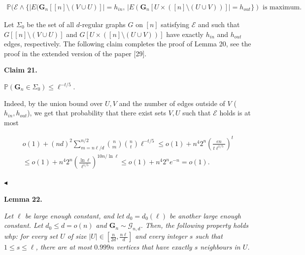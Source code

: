 \[\begin{gathered}
\mathbb{P}(\mathcal{E}\wedge\{|E(\mathbf{G}_{n}[[n]\setminus(V\cup U)]|=h_{in},\,|E(\mathbf{G}_{n}[U\times([n]\setminus(U\cup V))]|=h_{out}\})\text{ is maximum}.
\end{gathered}\]


Let $\Sigma_{0}$ be the set of all $d$-regular graphs $G$ on $[n]$ satisfying $\mathcal{E}$ and such that $G[[n]\setminus(V\cup U)]$ and $G[U\times([n]\setminus(U\cup V))]$ have exactly $h_{in}$ and $h_{out}$ edges, respectively. The following claim completes the proof of Lemma 20, see the proof in the extended version of the paper [29].\par





\par\medskip\noindent\textbf{
Claim 21. 
}\par



$\mathbb{P}(\mathbf{G}_{n}\in\Sigma_{0})\leq\ell^{-t/5}$.\par






Indeed, by the union bound over $U,V$ and the number of edges outside of $V$ ($h_{in},h_{out}$), we get that probability that there exist sets $V,U$ such that $\mathcal{E}$ holds is at most\par


\[\begin{gathered}
\displaystyle o(1)+(nd)^{2} \displaystyle\sum_{m=n\ell/d}^{n/2}{n\choose m}{n\choose t}\ell^{-t/5}\leq o(1)+n^{4}2^{n}\left(\frac{en}{t\ell^{1/5}}\right)^{t} \\
\displaystyle\leq o(1)+n^{4}2^{n}\left(\frac{\ln\ell}{\ell^{1/5}}\right)^{10n/\ln\ell}\leq o(1)+n^{4}2^{n}e^{-n}=o(1).
\end{gathered}\]


$\blacktriangleleft$\par





\par\medskip\noindent\textbf{
\textbf{Lemma 22}\textbf{.}
}\par



\emph{Let $\ell$ be large enough constant, and let $d_{0}=d_{0}(\ell)$ be another large enough constant. Let $d_{0}\leq d=o(n)$ and $\mathbf{G}_{n}\sim\mathcal{G}_{n,d}$. Then, the following property holds whp: for every set $U$ of size $|U|\in[\frac{n}{2d},\frac{n\ell}{d}]$ and every integer $s$ such that $1\leq s\leq\ell$, there are at most $0.999n$ vertices that have exactly $s$ neighbours in $U$.}\par



